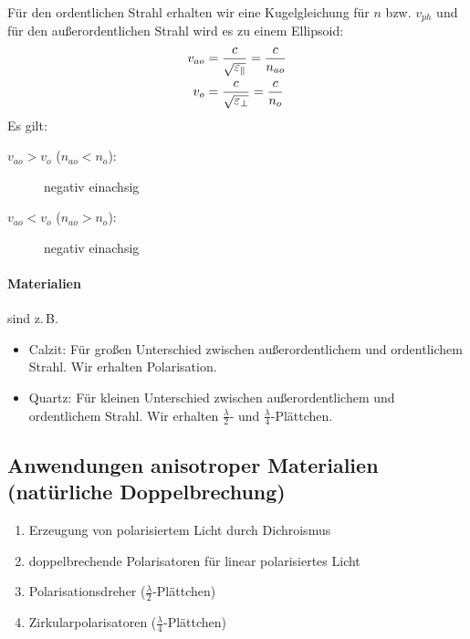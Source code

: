 Für den ordentlichen Strahl erhalten wir eine Kugelgleichung für $n$
bzw. $v_{ph}$ und
für den außerordentlichen Strahl wird es zu einem Ellipsoid:
\begin{align*}
  v_{ao} &= \frac{c}{\sqrt{\varepsilon_\parallel}} = \frac{c}{n_{ao}}\\
  v_o &= \frac{c}{\sqrt{\varepsilon_\bot}} = \frac{c}{n_{o}}\\
\end{align*}
Es gilt:
\begin{description}
\item[$v_{ao}>v_o$ ($n_{ao}<n_o$):] negativ einachsig
\item[$v_{ao}<v_o$ ($n_{ao}>n_o$):] negativ einachsig
\end{description}



\paragraph{Materialien}
sind z.\,B.
\begin{itemize}
\item Calzit: Für großen Unterschied zwischen außerordentlichem und
  ordentlichem Strahl. Wir erhalten Polarisation.
\item Quartz: Für kleinen Unterschied zwischen außerordentlichem und
  ordentlichem Strahl. Wir erhalten $\frac{\lambda}{2}$- und
  $\frac{\lambda}{4}$-Plättchen.
\end{itemize}

\subsection{Anwendungen anisotroper Materialien (natürliche
  Doppelbrechung)}
\begin{enumerate}
\item Erzeugung von polarisiertem Licht durch Dichroismus
\item doppelbrechende Polarisatoren für linear polarisiertes Licht
\item Polarisationsdreher ($\frac{\lambda}{2}$-Plättchen)
\item Zirkularpolarisatoren ($\frac{\lambda}{4}$-Plättchen)
\end{enumerate}

